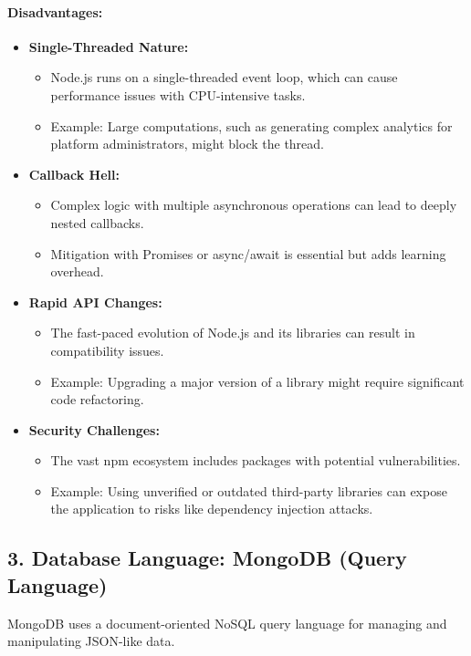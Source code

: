 \paragraph{Disadvantages:}
\begin{itemize}
    \item \textbf{Single-Threaded Nature:}
    \begin{itemize}
        \item Node.js runs on a single-threaded event loop, which can cause performance issues with CPU-intensive tasks.
        \item Example: Large computations, such as generating complex analytics for platform administrators, might block the thread.
    \end{itemize}
    \item \textbf{Callback Hell:}
    \begin{itemize}
        \item Complex logic with multiple asynchronous operations can lead to deeply nested callbacks.
        \item Mitigation with Promises or async/await is essential but adds learning overhead.
    \end{itemize}
    \item \textbf{Rapid API Changes:}
    \begin{itemize}
        \item The fast-paced evolution of Node.js and its libraries can result in compatibility issues.
        \item Example: Upgrading a major version of a library might require significant code refactoring.
    \end{itemize}
    \item \textbf{Security Challenges:}
    \begin{itemize}
        \item The vast npm ecosystem includes packages with potential vulnerabilities.
        \item Example: Using unverified or outdated third-party libraries can expose the application to risks like dependency injection attacks.
    \end{itemize}
\end{itemize}

\subsection*{3. Database Language: MongoDB (Query Language)}
MongoDB uses a document-oriented NoSQL query language for managing and manipulating JSON-like data.

